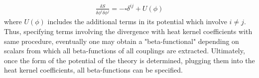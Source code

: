 \documentclass[fleqn]{article}
\begin{document}
\begin{align}
\frac{\delta S}{\delta \phi ^{i} \delta \phi ^{j}} = -\square \delta ^{ij} + U(\phi)
\end{align}
where $U(\phi)$ includes the additional terms in its potential which involve $i \neq j$. \\
Thus, specifying terms involving the divergence with heat kernel coefficients with same procedure, eventually one may obtain a "beta-functional" depending on scalars from which all beta-functions of all couplings are extracted.
Ultimately, once the form of the potential of the theory is determined, plugging them into the heat kernel coefficients, all beta-functions can be specified.
\end{document}
